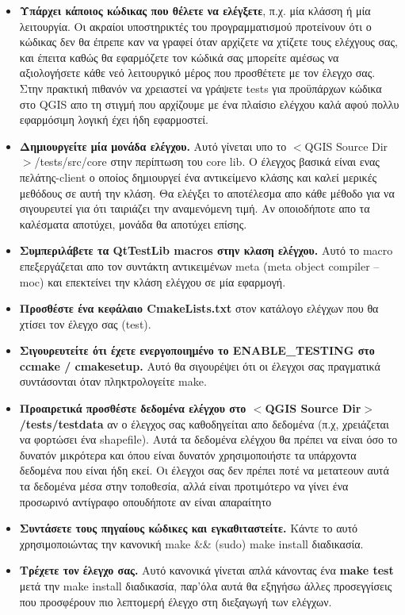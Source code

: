 \begin{itemize}
\item \textbf{Υπάρχει κάποιος κώδικας που θέλετε να ελέγξετε}, π.χ. μία κλάσση ή μία λειτουργία. Οι ακραίοι υποστηρικτές του προγραμματισμού προτείνουν ότι ο κώδικας δεν θα έπρεπε καν να γραφεί όταν αρχίζετε να χτίζετε τους ελέχγους σας, και έπειτα καθώς θα εφαρμόζετε τον κώδικά σας μπορείτε αμέσως να αξιολογήσετε κάθε νεό λειτουργικό μέρος που προσθέτετε με τον έλεγχο σας. Στην πρακτική πιθανόν να χρειαστεί να γράψετε tests για προϋπάρχων κώδικα στο QGIS απο τη στιγμή που αρχίζουμε με ένα πλαίσιο ελέγχου καλά αφού πολλυ εφαρμόσιμη λογική έχει ήδη εφαρμοστεί.

\item \textbf{Δημιουργείτε μία μονάδα ελέγχου.} Αυτό γίνεται υπο το $<$QGIS Source Dir$>$/tests/src/core 
   στην περίπτωση του core lib. Ο έλεγχος βασικά είναι ενας πελάτης-client ο οποίος δημιουργεί ένα αντικείμενο κλάσης και καλεί μερικές μεθόδους σε αυτή την κλάση. Θα ελέγξει το αποτέλεσμα απο κάθε μέθοδο για να σιγουρευτεί για ότι ταιριάζει την αναμενόμενη τιμή. Αν οποιοδήποτε απο τα καλέσματα αποτύχει, μονάδα θα αποτύχει επίσης.

\item \textbf{Συμπεριλάβετε τα QtTestLib macros στην κλαση ελέγχου.} Αυτό το macro επεξεργάζεται απο τον συντάκτη αντικειμένων meta (meta object compiler – moc) και επεκτείνει την κλάση ελέγχου σε μία εφαρμογή. 

\item \textbf{Προσθέστε ένα κεφάλαιο CmakeLists.txt} στον κατάλογο ελέγχων που θα χτίσει τον έλεγχο σας (test).

\item \textbf{Σιγουρευτείτε ότι έχετε ενεργοποιημένο το ENABLE_TESTING στο ccmake / cmakesetup.} Αυτό θα σιγουρέψει ότι οι έλεγχοι σας πραγματικά συντάσονται όταν πληκτρολογείτε make.

\item \textbf{Προαιρετικά προσθέστε δεδομένα ελέγχου στο $<$QGIS Source Dir$>$/tests/testdata} αν ο έλεγχος σας καθοδηγείται απο δεδομένα (π.χ, χρειάζεται να φορτώσει ένα shapefile). Αυτά τα δεδομένα ελέγχου θα πρέπει να είναι όσο το δυνατόν μικρότερα και όπου είναι δυνατόν χρησιμοποιήστε τα υπάρχοντα δεδομένα που είναι ήδη εκεί. Οι έλεγχοι σας δεν πρέπει ποτέ να μετατεουν αυτά τα δεδομένα μέσα στην τοποθεσία, αλλά είναι προτιμότερο να γίνει ένα προσωρινό αντίγραφο οπουδήποτε αν είναι απαραίτητο

\item \textbf{Συντάσετε τους πηγαίους κώδικες και εγκαθιταστείτε.} Κάντε το αυτό χρησιμοποιώντας την κανονική make \&\& (sudo) 
    make install διαδικασία.

\item \textbf{Τρέχετε τον έλεγχο σας.}  Αυτό κανονικά γίνεται απλά κάνοντας ένα \textbf{make test} 
 μετά την make install διαδικασία, παρ'όλα αυτά θα εξηγήσω άλλες προσεγγίσεις που προσφέρουν πιο λεπτομερή έλεγχο στη διεξαγωγή των ελέγχων.

\end{itemize}


